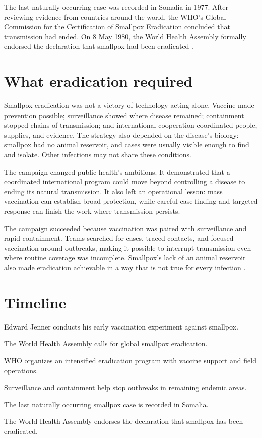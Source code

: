 \documentclass[12pt,oneside]{book}
\begin{document}
The last naturally occurring case was recorded in Somalia in 1977. After
reviewing evidence from countries around the world, the WHO's Global
Commission for the Certification of Smallpox Eradication concluded that
transmission had ended. On 8 May 1980, the World Health Assembly formally
endorsed the declaration that smallpox had been eradicated
\cite{whoSmallpoxVaccination,cdcSmallpoxHistory}.

\section{What eradication required}
Smallpox eradication was not a victory of technology acting alone. Vaccine
made prevention possible; surveillance showed where disease remained;
containment stopped chains of transmission; and international cooperation
coordinated people, supplies, and evidence. The strategy also depended on
the disease's biology: smallpox had no animal reservoir, and cases were
usually visible enough to find and isolate. Other infections may not share
these conditions.

The campaign changed public health's ambitions. It demonstrated that a
coordinated international program could move beyond controlling a disease
to ending its natural transmission. It also left an operational lesson:
mass vaccination can establish broad protection, while careful case finding
and targeted response can finish the work where transmission persists.

The campaign succeeded because vaccination was paired with surveillance and
rapid containment. Teams searched for cases, traced contacts, and focused
vaccination around outbreaks, making it possible to interrupt transmission
even where routine coverage was incomplete. Smallpox’s lack of an animal
reservoir also made eradication achievable in a way that is not true for every
infection \cite{whoSmallpoxProgram,cdcSmallpoxHistory}.

\section*{Timeline}
\begin{description}[leftmargin=2.3cm,style=nextline]
  \item[1796] Edward Jenner conducts his early vaccination experiment against smallpox.
  \item[1958] The World Health Assembly calls for global smallpox eradication.
  \item[1966--1967] WHO organizes an intensified eradication program with vaccine support and field operations.
  \item[1970s] Surveillance and containment help stop outbreaks in remaining endemic areas.
  \item[1977] The last naturally occurring smallpox case is recorded in Somalia.
  \item[8 May 1980] The World Health Assembly endorses the declaration that smallpox has been eradicated.
\end{description}
\end{document}
